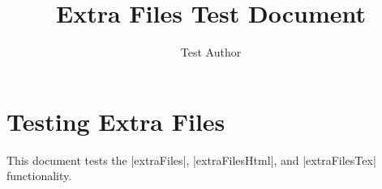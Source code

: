 \documentclass[oneside]{memoir}
\title{\sffamily Extra Files Test Document}
\author{\sffamily Test Author}
\date{\sffamily }
\begin{document}
\frontmatter

\begin{titlingpage}
\maketitle
\end{titlingpage}

\tableofcontents



\mainmatter
\chapter{Testing Extra Files}\label{Extra--Files--Test--Document----Testing--Extra--Files}

This document tests the \LeanVerb|extraFiles|, \LeanVerb|extraFilesHtml|, and \LeanVerb|extraFilesTex| functionality.
\end{document}
